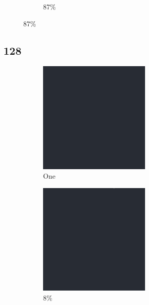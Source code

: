 \documentclass[12pt, fleqn]{report}                             %
\theoremstyle{break}                                            %
\begin{document}
\begin{figure}[ht!]
\begin{subfigure}[b]{0.4\linewidth}
          \caption{87\%}
        \end{subfigure}
      \end{figure}


      \clearpage
      \subsection{128}
      \begin{figure}[ht!]
        \centering
        \begin{subfigure}[b]{0.4\linewidth}
          \includegraphics[width=0.6\textwidth]{Images/128/a.png}
          \caption{One}
        \end{subfigure}
        \begin{subfigure}[b]{0.4\linewidth}
          \includegraphics[width=0.6\textwidth]{Images/128/b.png}
          \caption{8\%}
        \end{subfigure}
        \begin{subfigure}[b]{0.4\linewidth}

\end{subfigure}
\end{figure}
\end{document}
